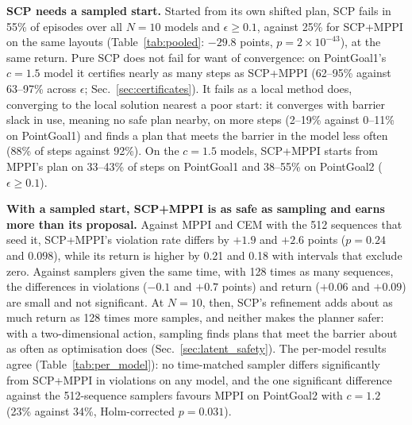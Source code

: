 \begin{table}[t]
  \centering
  \caption{SCP+MPPI minus each baseline on the $c=1.5$ world models at $N=10$, pooled over both tasks and
  $\epsilon\ge0.1$ and paired by task, margin and seed (Tables~\ref{tab:pooled_c1_2} and~\ref{tab:pooled_cinf} in the
  appendix give the other bounds). A negative $\Delta$ violation rate or a positive $\Delta$ return favours SCP+MPPI.
  Brackets: 95\% intervals. $P$(safer) and $P$(higher return): the probability, given the data, that SCP+MPPI's
  violation rate is lower, or its return higher, than the baseline's on these models (Sec.~\ref{sec:protocol}).}
  \label{tab:pooled}
  \small
  
\end{table}

\textbf{SCP needs a sampled start.} Started from its own shifted plan, SCP fails in 55\% of episodes over all $N=10$
models and $\epsilon\ge0.1$, against 25\% for SCP+MPPI on the same layouts (Table~\ref{tab:pooled}: $-29.8$ points,
$p=2\times10^{-43}$), at the same return. Pure SCP does not fail for want of convergence: on PointGoal1's $c=1.5$ model
it certifies nearly as many steps as SCP+MPPI (62--95\% against 63--97\% across $\epsilon$; Sec.~\ref{sec:certificates}). It fails
as a local method does, converging to the local solution nearest a poor start: it converges with barrier slack in use,
meaning no safe plan nearby, on more steps (2--19\% against 0--11\% on PointGoal1) and finds a plan that meets the
barrier in the model less often (88\% of steps against 92\%). On the $c=1.5$ models, SCP+MPPI starts from MPPI's plan on
33--43\% of steps on PointGoal1 and 38--55\% on PointGoal2 ($\epsilon\ge0.1$).

\textbf{With a sampled start, SCP+MPPI is as safe as sampling and earns more than its proposal.} Against MPPI and CEM
with the 512 sequences that seed it, SCP+MPPI's violation rate differs by $+1.9$ and $+2.6$ points ($p=0.24$ and
$0.098$), while its return is higher by 0.21 and 0.18 with intervals that exclude zero. Against samplers given the same
time, with 128 times as many sequences, the differences in violations ($-0.1$ and $+0.7$ points) and return ($+0.06$
and $+0.09$) are small and not significant. At $N=10$, then, SCP's refinement adds about as much return as 128 times
more samples, and neither makes the planner safer: with a two-dimensional action, sampling finds plans that meet the
barrier about as often as optimisation does (Sec.~\ref{sec:latent_safety}). The per-model results agree
(Table~\ref{tab:per_model}): no time-matched sampler differs significantly from SCP+MPPI in violations on any model,
and the one significant difference against the 512-sequence samplers favours MPPI on PointGoal2 with $c=1.2$ (23\%
against 34\%, Holm-corrected $p=0.031$).

